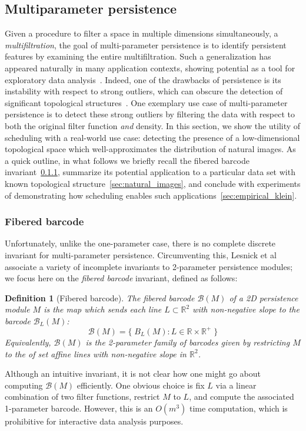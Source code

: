 \documentclass[sn-mathphys]{sn-jnl}
\newtheorem{definition}{Definition}
\begin{document}
\subsection{Multiparameter persistence}
Given a procedure to filter a space in multiple dimensions simultaneously, a \emph{multifiltration}, the goal of multi-parameter persistence is to identify persistent features by examining the entire multifiltration. 
Such a generalization has appeared naturally in many application contexts, showing potential as a tool for exploratory data analysis~\cite{lesnick2012multidimensional}. Indeed, one of the drawbacks of persistence is its instability with respect to strong outliers, which can obscure the detection of significant topological structures~\cite{buchet2015topological}.
One exemplary use case of multi-parameter persistence is to detect these strong outliers by filtering the data with respect to both the original filter function \emph{and} density.
In this section, we show the utility of scheduling with a real-world use case: detecting the presence of a low-dimensional topological space which well-approximates the distribution of natural images. 
As a quick outline, in what follows we briefly recall the fibered barcode invariant~\ref{sec:fibered_barcode}, summarize its potential application to a particular data set with known topological structure~\ref{sec:natural_images}, and conclude with experiments of demonstrating how scheduling enables such applications~\ref{sec:empirical_klein}.   

\subsubsection{Fibered barcode}\label{sec:fibered_barcode}
Unfortunately, unlike the one-parameter case, there is no complete discrete invariant for multi-parameter persistence.
Circumventing this, Lesnick et al~\cite{lesnick2015interactive} associate a variety of incomplete invariants to 2-parameter persistence modules; we focus here on the \emph{fibered barcode} invariant, defined as follows: 
\begin{definition}[Fibered barcode]
	The fibered barcode $\mathcal{B}(M)$ of a 2D persistence module $M$ is the map which sends each line  $L \subset \mathbb{R}^2$ with non-negative slope to the barcode $\mathcal{B}_L(M)$: 
$$ \mathcal{B}(M) = \{ \; B_L(M) : L \in \mathbb{R} \times \mathbb{R}^{+} \; \}$$
Equivalently, $\mathcal{B}(M)$ is the 2-parameter family of barcodes given by restricting $M$ to the of set affine lines with non-negative slope in $\mathbb{R}^2$. 
\end{definition} 
\noindent Although an intuitive invariant, it is not clear how one might go about computing $\mathcal{B}(M)$ efficiently. 
One obvious choice is fix $L$ via a linear combination of two filter functions, restrict $M$ to $L$, and compute the associated 1-parameter barcode. 
However, this is an $O(m^3)$ time computation, which is prohibitive for interactive data analysis purposes. 
\end{document}

